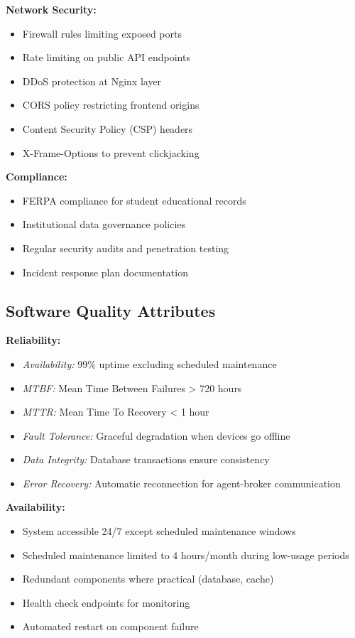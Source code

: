 \documentclass[12pt,a4paper]{article}
\begin{document}
\textbf{Network Security:}

\begin{itemize}
    \item Firewall rules limiting exposed ports
    \item Rate limiting on public API endpoints
    \item DDoS protection at Nginx layer
    \item CORS policy restricting frontend origins
    \item Content Security Policy (CSP) headers
    \item X-Frame-Options to prevent clickjacking
\end{itemize}

\textbf{Compliance:}

\begin{itemize}
    \item FERPA compliance for student educational records
    \item Institutional data governance policies
    \item Regular security audits and penetration testing
    \item Incident response plan documentation
\end{itemize}
\subsection{Software Quality Attributes}
\label{sec:quality}

\textbf{Reliability:}

\begin{itemize}
    \item \textit{Availability:} 99\% uptime excluding scheduled maintenance
    \item \textit{MTBF:} Mean Time Between Failures > 720 hours
    \item \textit{MTTR:} Mean Time To Recovery < 1 hour
    \item \textit{Fault Tolerance:} Graceful degradation when devices go offline
    \item \textit{Data Integrity:} Database transactions ensure consistency
    \item \textit{Error Recovery:} Automatic reconnection for agent-broker communication
\end{itemize}

\textbf{Availability:}

\begin{itemize}
    \item System accessible 24/7 except scheduled maintenance windows
    \item Scheduled maintenance limited to 4 hours/month during low-usage periods
    \item Redundant components where practical (database, cache)
    \item Health check endpoints for monitoring
    \item Automated restart on component failure
\end{itemize}
\end{document}
